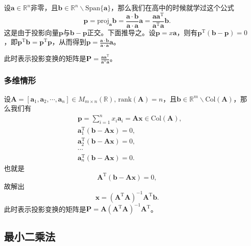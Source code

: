 \documentclass[a4paper, 12pt]{article}
\begin{document}
    设$\boldsymbol a\in\mathbb R^n$非零，且$\boldsymbol b\in\mathbb R^n\backslash\mathrm{Span}\{\boldsymbol a\}$，那么我们在高中的时候就学过这个公式
    \[
    \boldsymbol p=\mathrm {proj}_{\boldsymbol a}\boldsymbol b=\frac{\boldsymbol a\cdot\boldsymbol b}{\boldsymbol a\cdot\boldsymbol a}\boldsymbol a=\frac{\boldsymbol a\boldsymbol a^{\mathrm T}}{\boldsymbol a^{\mathrm T}\boldsymbol a}\boldsymbol b.
    \]
    这是由于投影向量$\boldsymbol p$与$\boldsymbol b-\boldsymbol p$正交。下面推导之。设$\boldsymbol p=x\boldsymbol a$，则有$\boldsymbol p^\mathrm T(\boldsymbol b-\boldsymbol p)=0$，即$\boldsymbol p^\mathrm T\boldsymbol b=\boldsymbol p^\mathrm T\boldsymbol p$，从而得到$\boldsymbol p=\frac{\boldsymbol a\cdot\boldsymbol b}{\boldsymbol a\cdot\boldsymbol a}\boldsymbol a$。

    此时表示投影变换的矩阵是$\boldsymbol P=\frac{\boldsymbol a\boldsymbol a^{\mathrm T}}{\boldsymbol a^{\mathrm T}\boldsymbol a}$。

    \subsubsection{多维情形}

    设$\boldsymbol A=[\boldsymbol a_1,\boldsymbol a_2,\cdots,\boldsymbol a_n]\in M_{m\times n}(\mathbb R),\,\mathrm{rank}(\boldsymbol A)=n$，且$\boldsymbol b\in\mathbb R^m\backslash\mathrm{Col}(\boldsymbol A)$，那么我们有
    \begin{align*}
        &\boldsymbol p=\sum_{i=1}^n x_i\boldsymbol a_i=\boldsymbol A\boldsymbol x\in\mathrm{Col}(\boldsymbol A),\\
        &\boldsymbol a_1^\mathrm T(\boldsymbol b-\boldsymbol A\boldsymbol x)=0,\\
        &\boldsymbol a_2^\mathrm T(\boldsymbol b-\boldsymbol A\boldsymbol x)=0,\\
        &\cdots\\
        &\boldsymbol a_n^\mathrm T(\boldsymbol b-\boldsymbol A\boldsymbol x)=0.
    \end{align*}
    也就是
    \[
    \boldsymbol A^\mathrm T(\boldsymbol b-\boldsymbol A\boldsymbol x)=0,
    \]
    故解出
    \[
    \boldsymbol x=(\boldsymbol A^\mathrm T\boldsymbol A)^{-1}\boldsymbol A^\mathrm T\boldsymbol b.
    \]
    此时表示投影变换的矩阵是$\boldsymbol P=\boldsymbol A(\boldsymbol A^\mathrm T\boldsymbol A)^{-1}\boldsymbol A^\mathrm T$。

    \subsection{最小二乘法}
\end{document}
